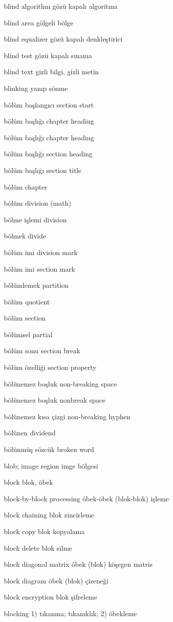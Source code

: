 \documentclass[12pt,fleqn]{article}\usepackage{../../common}
\begin{document}
blind algorithm gözü kapalı algoritma

blind area gölgeli bölge

blind equalizer gözü kapalı denkleştirici

blind test gözü kapalı sınama

blind text gizli bilgi, gizli metin

blinking yanıp sönme

bölüm başlangıcı section start

bölüm başlığı chapter heading

bölüm başlığı chapter heading

bölüm başlığı section heading

bölüm başlığı section title

bölüm chapter

bölüm division (math)

bölme işlemi division

bölmek divide

bölüm imi division mark

bölüm imi section mark

bölümlemek partition

bölüm quotient

bölüm section

bölümsel partial

bölüm sonu section break

bölüm özelliği section property

bölünemez boşluk non-breaking space

bölünemez boşluk nonbreak space

bölünemez kısa çizgi non-breaking hyphen

bölünen dividend

bölünmüş sözcük broken word

blob; image region imge bölgesi

block blok, öbek

block-by-block processing öbek-öbek (blok-blok) işleme

block chaining blok zincirleme

block copy blok kopyalama

block delete blok silme

block diagonal matrix öbek (blok) köşegen matris

block diagram öbek (blok) çizeneği

block encryption blok şifreleme

blocking 1) tıkanma; tıkanıklık; 2) öbekleme
\end{document}
